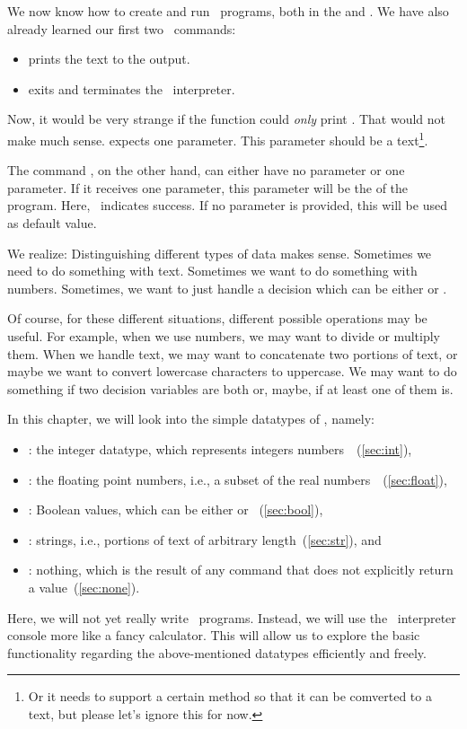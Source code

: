 %
%
We now know how to create and run \python\ programs, both in the  and .
We have also already learned our first two \python\ commands:%
%
\begin{itemize}%
\item {} prints the text  to the output.
\item {} exits and terminates the \python\ interpreter.%
\end{itemize}%
%
Now, it would be very strange if the  function could \emph{only} print .
That would not make much sense.
 expects one parameter.
This parameter should be a text\footnote{Or it needs to support a certain method so that it can be comverted to a text, but please let's ignore this for now.}.

The command , on the other hand, can either have no parameter or one parameter.
If it receives one parameter, this parameter will be the  of the program.
Here, ~indicates success.
If no parameter is provided, this will be used as default value.

We realize:
Distinguishing different types of data makes sense.
Sometimes we need to do something with text.
Sometimes we want to do something with numbers.
Sometimes, we want to just handle a decision which can be either  or .

Of course, for these different situations, different possible operations may be useful.
For example, when we use numbers, we may want to divide or multiply them.
When we handle text, we may want to concatenate two portions of text, or maybe we want to convert lowercase characters to uppercase.
We may want to do something if two decision variables are both  or, maybe, if at least one of them is.

In this chapter, we will look into the simple datatypes of \python, namely:%
%
\begin{itemize}%
%
\item {}: the integer datatype, which represents integers numbers~\integerNumbers~(\cref{sec:int}),%
\item {}: the floating point numbers, i.e., a subset of the real numbers~\realNumbers~(\cref{sec:float}),%
\item {}: Boolean values, which can be either  or ~(\cref{sec:bool}),%
\item {}: strings, i.e., portions of text of arbitrary length~(\cref{sec:str}), and%
\item {}: nothing, which is the result of any command that does not explicitly return a value~(\cref{sec:none}).%
%
\end{itemize}%
%
Here, we will not yet really write \python\ programs.
Instead, we will use the \python\ interpreter console more like a fancy calculator.
This will allow us to explore the basic functionality regarding the above-mentioned datatypes efficiently and freely.%
%
\endhsection%
%
